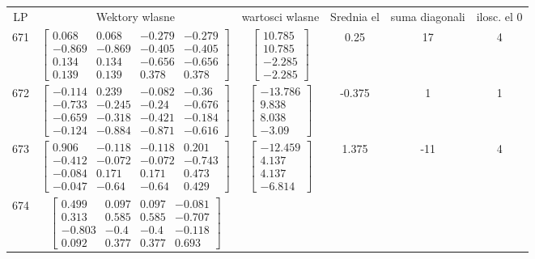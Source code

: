 \documentclass[a4paper,12pt]{article}
\begin{document}
\bgroup {} \vspace{0.2in} \begin{tabular}{c c c c c c}
LP &Wektory wlasne & wartosci wlasne & Srednia el & suma diagonali & ilosc. el 0\\
671
&
$\begin{bmatrix} 0.068 & 0.068 & -0.279 & -0.279 \\ -0.869 & -0.869 & -0.405 & -0.405 \\ 0.134 & 0.134 & -0.656 & -0.656 \\ 0.139 & 0.139 & 0.378 & 0.378 \end{bmatrix}$
&
$\begin{bmatrix} 10.785 \\ 10.785 \\ -2.285 \\ -2.285 \end{bmatrix}$
&
0.25
&
17
&
4
\\
672
&
$\begin{bmatrix} -0.114 & 0.239 & -0.082 & -0.36 \\ -0.733 & -0.245 & -0.24 & -0.676 \\ -0.659 & -0.318 & -0.421 & -0.184 \\ -0.124 & -0.884 & -0.871 & -0.616 \end{bmatrix}$
&
$\begin{bmatrix} -13.786 \\ 9.838 \\ 8.038 \\ -3.09 \end{bmatrix}$
&
-0.375
&
1
&
1
\\
673
&
$\begin{bmatrix} 0.906 & -0.118 & -0.118 & 0.201 \\ -0.412 & -0.072 & -0.072 & -0.743 \\ -0.084 & 0.171 & 0.171 & 0.473 \\ -0.047 & -0.64 & -0.64 & 0.429 \end{bmatrix}$
&
$\begin{bmatrix} -12.459 \\ 4.137 \\ 4.137 \\ -6.814 \end{bmatrix}$
&
1.375
&
-11
&
4
\\
674
&
$\begin{bmatrix} 0.499 & 0.097 & 0.097 & -0.081 \\ 0.313 & 0.585 & 0.585 & -0.707 \\ -0.803 & -0.4 & -0.4 & -0.118 \\ 0.092 & 0.377 & 0.377 & 0.693 \end{bmatrix}$

\end{tabular}
\end{document}
